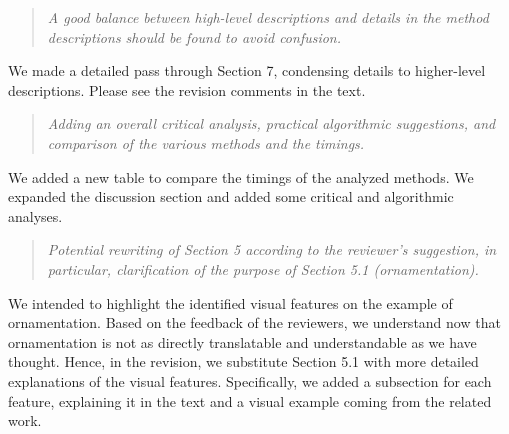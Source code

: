 \documentclass{egpubl}
\newcommand{\rev}[2]{{\color{greenrev}\textsuperscript{#1}#2}}
\renewcommand{\rev}[2]{{#2}}
\begin{document}



\begin{quote}
\emph{
    A good balance between high-level descriptions and details in the method descriptions should be found to avoid confusion.
    }
\end{quote}

\rev{}{We made a detailed pass through Section 7, condensing details to higher-level descriptions. Please see the revision comments in the text.}

\begin{quote}
\emph{
    Adding an overall critical analysis, practical algorithmic suggestions, and comparison of the various methods and the timings.
    }
\end{quote}

\rev{}{We added a new table to compare the timings of the analyzed methods. We expanded the discussion section and added some critical and algorithmic analyses.}


\begin{quote}
\emph{
    Potential rewriting of Section 5 according to the reviewer's suggestion, in particular, clarification of the purpose of Section 5.1 (ornamentation).
    }
\end{quote}

\rev{}{We intended to highlight the identified visual features on the example of ornamentation. Based on the feedback of the reviewers, we understand now that ornamentation is not as directly translatable and understandable as we have thought. Hence, in the revision, we substitute Section 5.1 with more detailed explanations of the visual features. Specifically, we added a subsection for each feature, explaining it in the text and a visual example coming from the related work.}
\end{document}
